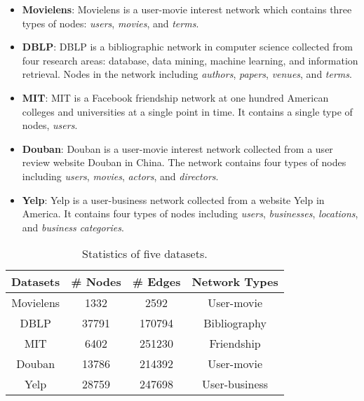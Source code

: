 \documentclass[conference]{IEEEtran}
\begin{document}
\begin{itemize}
    \item \textbf{Movielens}: Movielens is a user-movie interest network which contains three types of nodes: {\itshape users}, {\itshape movies}, and {\itshape terms}.
    
    \item \textbf{DBLP}: DBLP is a bibliographic network in computer science collected from four research areas: database, data mining, machine learning, and information retrieval. Nodes in the network including {\itshape authors}, {\itshape papers}, {\itshape venues}, and {\itshape terms}.
    
    \item \textbf{MIT}: MIT is a Facebook friendship network at one hundred American colleges and universities at a single point in time. It contains a single type of nodes, {\itshape users}.
    
    \item \textbf{Douban}: Douban is a user-movie interest network collected from a user review website Douban in China. The network contains four types of nodes including {\itshape users}, {\itshape movies}, {\itshape actors}, and {\itshape directors}.
    
    \item \textbf{Yelp}: Yelp is a user-business network collected from a website Yelp in America. It contains four types of nodes including {\itshape users}, {\itshape businesses}, {\itshape locations}, and {\itshape business categories}.
\end{itemize}

\begin{table}
	\centering
	\caption{{\small Statistics of five datasets.}}\label{table1}
	\begin{tabular}{cccc}
		\toprule
		\textbf{Datasets} & \# Nodes & \# Edges & Network Types \\
		\midrule
		Movielens & 1332 & 2592 & User-movie \\
		DBLP & 37791 & 170794 & Bibliography \\
		MIT & 6402 & 251230 & Friendship \\
		Douban & 13786 & 214392 & User-movie\\
		Yelp & 28759 & 247698 & User-business\\
		\bottomrule
	\end{tabular}
\end{table}
\end{document}
